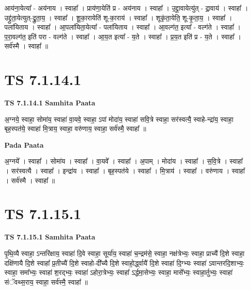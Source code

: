 \documentclass[17pt]{extarticle}
\begin{document}
आय॑ना॒येत्या᳚ - अय॑नाय । स्वाहा᳚ । प्राय॑णा॒येति॑ प्र - अय॑नाय । स्वाहा᳚ । उ॒द्द्रा॒वायेत्यु॑त् - द्रा॒वाय॑ । स्वाहा᳚ । उद्द्रु॑ता॒येत्युत्-द्रु॒ता॒य॒ । स्वाहा᳚ । शू॒का॒रायेति॑ शू-का॒राय॑ । स्वाहा᳚ । शूकृ॑ता॒येति॒ शू-कृ॒ता॒य॒ । स्वाहा᳚ । पला॑यिताय । स्वाहा᳚ । आ॒पला॑यिता॒येत्या᳚ - पला॑यिताय । स्वाहा᳚ । आ॒वल्ग॑त॒ इत्या᳚ - वल्ग॑ते । स्वाहा᳚ । प॒रा॒वल्ग॑त॒ इति॑ परा - वल्ग॑ते । स्वाहा᳚ । आ॒य॒त इत्या᳚ - य॒ते । स्वाहा᳚ । प्र॒य॒त इति॑ प्र - य॒ते । स्वाहा᳚ । सर्व॑स्मै । स्वाहा᳚ ॥  \newline





\section{ TS 7.1.14.1 }

\textbf{TS 7.1.14.1 } \newline
\textbf{Samhita Paata} \newline

अ॒ग्नये॒ स्वाहा॒ सोमा॑य॒ स्वाहा॑ वा॒यवे॒ स्वाहा॒ ऽपां मोदा॑य॒ स्वाहा॑ सवि॒त्रे स्वाहा॒ सर॑स्वत्यै॒ स्वाहे-न्द्रा॑य॒ स्वाहा॒ बृह॒स्पत॑ये॒ स्वाहा॑ मि॒त्राय॒ स्वाहा॒ वरु॑णाय॒ स्वाहा॒ सर्व॑स्मै॒ स्वाहा᳚ ॥ \newline

\textbf{Pada Paata} \newline

अ॒ग्नये᳚ । स्वाहा᳚ । सोमा॑य । स्वाहा᳚ । वा॒यवे᳚ । स्वाहा᳚ । अ॒पाम् । मोदा॑य । स्वाहा᳚ । स॒वि॒त्रे । स्वाहा᳚ । सर॑स्वत्यै । स्वाहा᳚ । इन्द्रा॑य । स्वाहा᳚ । बृह॒स्पत॑ये । स्वाहा᳚ । मि॒त्राय॑ । स्वाहा᳚ । वरु॑णाय । स्वाहा᳚ । सर्व॑स्मै । स्वाहा᳚ ॥  \newline





\section{ TS 7.1.15.1 }

\textbf{TS 7.1.15.1 } \newline
\textbf{Samhita Paata} \newline

पृ॒थि॒व्यै स्वाहा॒ ऽन्तरि॑क्षाय॒ स्वाहा॑ दि॒वे स्वाहा॒ सूर्या॑य॒ स्वाहा॑ च॒न्द्रम॑से॒ स्वाहा॒ नक्ष॑त्रेभ्यः॒ स्वाहा॒ प्राच्यै॑ दि॒शे स्वाहा॒ दक्षि॑णायै दि॒शे स्वाहा᳚ प्र॒तीच्यै॑ दि॒शे स्वाहो-दी᳚च्यै दि॒शे स्वाहो॒र्द्ध्वायै॑ दि॒शे स्वाहा॑ दि॒ग्भ्यः स्वाहा॑ ऽवान्तरदि॒शाभ्यः॒ स्वाहा॒ समा᳚भ्यः॒ स्वाहा॑ श॒रद्भ्यः॒ स्वाहा॑ ऽहोरा॒त्रेभ्यः॒ स्वाहा᳚ ऽर्द्धमा॒सेभ्यः॒ स्वाहा॒ मासे᳚भ्यः॒ स्वाहा॒र्तुभ्यः॒ स्वाहा॑ संॅवथ्स॒राय॒ स्वाहा॒ सर्व॑स्मै॒ स्वाहा᳚ ॥ \newline
\end{document}
